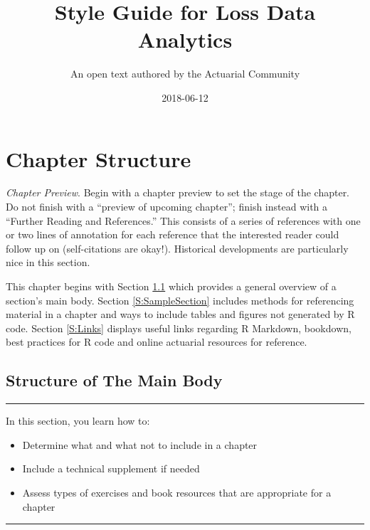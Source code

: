 \documentclass[]{book}
\title{Style Guide for Loss Data Analytics}
\author{An open text authored by the Actuarial Community}
\date{2018-06-12}
\providecommand{\tightlist}{%
  \setlength{\itemsep}{0pt}\setlength{\parskip}{0pt}}
\theoremstyle{definition}
\theoremstyle{definition}
\theoremstyle{definition}
\theoremstyle{remark}
\begin{document}
\maketitle

{
\setcounter{tocdepth}{1}
\tableofcontents
}
\chapter{Chapter Structure}\label{chapter-structure}

\emph{Chapter Preview}. Begin with a chapter preview to set the stage of
the chapter. Do not finish with a ``preview of upcoming chapter'';
finish instead with a ``Further Reading and References.'' This consists
of a series of references with one or two lines of annotation for each
reference that the interested reader could follow up on (self-citations
are okay!). Historical developments are particularly nice in this
section.

This chapter begins with Section \ref{S:StructureBody} which provides a
general overview of a section's main body. Section \ref{S:SampleSection}
includes methods for referencing material in a chapter and ways to
include tables and figures not generated by R code. Section
\ref{S:Links} displays useful links regarding R Markdown, bookdown, best
practices for R code and online actuarial resources for reference.

\section{Structure of The Main Body}\label{S:StructureBody}

\begin{center}\rule{0.5\linewidth}{\linethickness}\end{center}

In this section, you learn how to:

\begin{itemize}
\tightlist
\item
  Determine what and what not to include in a chapter
\item
  Include a technical supplement if needed
\item
  Assess types of exercises and book resources that are appropriate for
  a chapter
\end{itemize}

\begin{center}\rule{0.5\linewidth}{\linethickness}\end{center}
\end{document}
